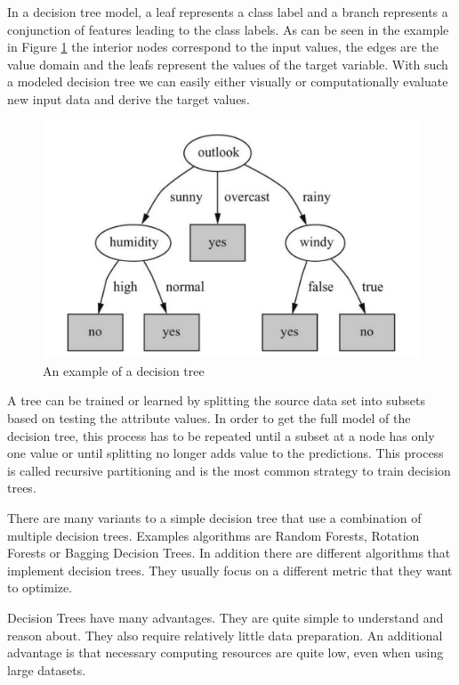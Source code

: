 In a decision tree model, a leaf represents a class label and a branch represents a conjunction of features leading to the class labels. As can be seen in the example in Figure \ref{fig:image-decision-tree} the interior nodes correspond to the input values, the edges are the value domain and the leafs represent the values of the target variable. With such a modeled decision tree we can easily either visually or computationally evaluate new input data and derive the target values.

\begin{figure}[!ht]
	\centering
		\includegraphics[width=1.0\textwidth]{images/decision-tree}
	\caption{An example of a decision tree \cite{WikipediaDecisionTrees}}
	\label{fig:image-decision-tree}
\end{figure}

A tree can be trained or learned by splitting the source data set into subsets based on testing the attribute values. In order to get the full model of the decision tree, this process has to be repeated until a subset at a node has only one value or until splitting no longer adds value to the predictions. This process is called recursive partitioning and is the most common strategy to train decision trees. \cite{DataMining}

There are many variants to a simple decision tree that use a combination of multiple decision trees. Examples algorithms are Random Forests, Rotation Forests or Bagging Decision Trees. In addition there are different algorithms that implement decision trees. They usually focus on a different metric that they want to optimize. 

Decision Trees have many advantages. They are quite simple to understand and reason about. They also require relatively little data preparation. An additional advantage is that necessary computing resources are quite low, even when using large datasets. \cite{DataMining}


